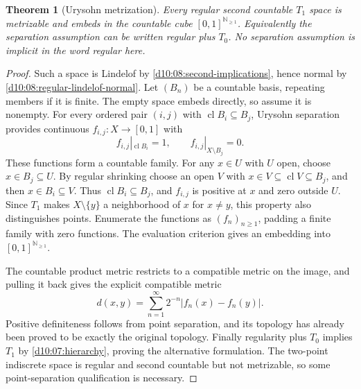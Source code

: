 \documentclass[11pt,oneside,openany]{book}
\newtheorem{theorem}{Theorem}[chapter]
\theoremstyle{definition}
\theoremstyle{remark}
\newcommand{\N}{\mathbb N}\newcommand{\Z}{\mathbb Z}\newcommand{\Q}{\mathbb Q}
\DeclareMathOperator{\cl}{cl}
\begin{document}
\begin{theorem}[Urysohn metrization]\label{d10:10:urysohn-metrization}
Every regular second countable $T_1$ space is metrizable and embeds in the countable cube $[0,1]^{\N_{\geq1}}$. Equivalently the separation assumption can be written regular plus $T_0$. No separation assumption is implicit in the word regular here.
\end{theorem}
\begin{proof}
Such a space is Lindelof by \cref{d10:08:second-implications}, hence normal by \cref{d10:08:regular-lindelof-normal}. Let $(B_n)$ be a countable basis, repeating members if it is finite. The empty space embeds directly, so assume it is nonempty. For every ordered pair $(i,j)$ with $\cl B_i\subseteq B_j$, Urysohn separation provides continuous $f_{i,j}:X\to[0,1]$ with
\[
 f_{i,j}|_{\cl B_i}=1,\qquad f_{i,j}|_{X\setminus B_j}=0.
\]
These functions form a countable family. For any $x\in U$ with $U$ open, choose $x\in B_j\subseteq U$. By regular shrinking choose an open $V$ with $x\in V\subseteq\cl V\subseteq B_j$, and then $x\in B_i\subseteq V$. Thus $\cl B_i\subseteq B_j$, and $f_{i,j}$ is positive at $x$ and zero outside $U$. Since $T_1$ makes $X\setminus\{y\}$ a neighborhood of $x$ for $x\ne y$, this property also distinguishes points. Enumerate the functions as $(f_n)_{n\geq1}$, padding a finite family with zero functions. The evaluation criterion gives an embedding into $[0,1]^{\N_{\geq1}}$.

The countable product metric restricts to a compatible metric on the image, and pulling it back gives the explicit compatible metric
\[
 d(x,y)=\sum_{n=1}^{\infty}2^{-n}|f_n(x)-f_n(y)|.
\]
Positive definiteness follows from point separation, and its topology has already been proved to be exactly the original topology. Finally regularity plus $T_0$ implies $T_1$ by \cref{d10:07:hierarchy}, proving the alternative formulation. The two-point indiscrete space is regular and second countable but not metrizable, so some point-separation qualification is necessary.
\end{proof}
\end{document}
